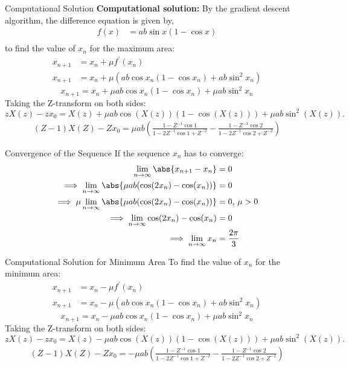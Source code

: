 \documentclass{beamer}
\begin{document}
	\begin{frame}{Computational Solution}
		\textbf{Computational solution:}
		\newline
		By the gradient descent algorithm, the difference equation is given by,
		\begin{align}
			f(x) &= ab \sin{x} (1 - \cos{x}) \\
		\end{align}
		to find the value of $x_n$ for the maximum area:
		\begin{align}
			x_{n + 1} &= x_n + \mu f^{\prime}\left(x_{n}\right) \\
			x_{n + 1} &= x_n + \mu \left(ab \cos{x_{n}} (1 - \cos{x_{n}}) + ab \sin^2{x_{n}}\right)
		\end{align}
		\[
		x_{n+1} = x_n + \mu ab \cos x_n (1 - \cos x_n) + \mu ab \sin^2 x_n
		\]
		Taking the Z-transform on both sides:
		\[
		zX(z) - zx_0 = X(z) + \mu ab \cos(X(z))(1 - \cos(X(z))) + \mu ab \sin^2(X(z)).
		\]
		\begin{align}
			(Z-1)X(Z)-Zx_{0}={\mu}ab\left(\frac{1-Z^{-1}\cos{1}}{1-2Z^{-1}\cos{1}+Z^{-2}}-\frac{1-Z^{-1}\cos{2}}{1-2Z^{-1}\cos{2}+Z^{-2}}\right)
		\end{align}
	\end{frame}
	\begin{frame}{Convergence of the Sequence}
		If the sequence $x_n$ has to converge:
		\begin{align}
			\lim_{n\to\infty} \abs{x_{n + 1} - x_n} &= 0 \\
			\implies \lim_{n\to\infty} \abs{{\mu}ab(\cos(2x_{n})-\cos(x_{n}))} &= 0 \\
			\implies \mu \lim_{n\to\infty} \abs{{\mu}ab(\cos(2x_{n})-\cos(x_{n}))} &= 0 \text{, } \mu > 0 \\
			\implies \lim_{n\to\infty} \cos(2x_{n})-\cos(x_{n}) &= 0 \\
			\implies \lim_{n\to\infty} x_{n} &= \frac{2\pi}{3}
		\end{align}
	\end{frame}
	\begin{frame}{Computational Solution for Minimum Area}
		To find the value of $x_n$ for the minimum area:
		\begin{align}
			x_{n + 1} &= x_n - \mu f^{\prime}(x_{n}) \\
			x_{n + 1} &= x_n - \mu \left( ab \cos{x_{n}} (1 - \cos{x_{n}}) + ab \sin^2{x_{n}} \right)
		\end{align}
		\[
		x_{n+1} = x_n - \mu ab \cos x_n (1 - \cos x_n) + \mu ab \sin^2 x_n
		\]
		Taking the Z-transform on both sides:
		\[
		zX(z) - zx_0 = X(z) - \mu ab \cos(X(z))(1 - \cos(X(z))) + \mu ab \sin^2(X(z)).
		\]
		\begin{align}
			(Z-1)X(Z) - Zx_{0} = -{\mu}ab\left(\frac{1-Z^{-1}\cos{1}}{1-2Z^{-1}\cos{1}+Z^{-2}} - \frac{1-Z^{-1}\cos{2}}{1-2Z^{-1}\cos{2}+Z^{-2}} \right)
		\end{align}
	\end{frame}
\end{document}
